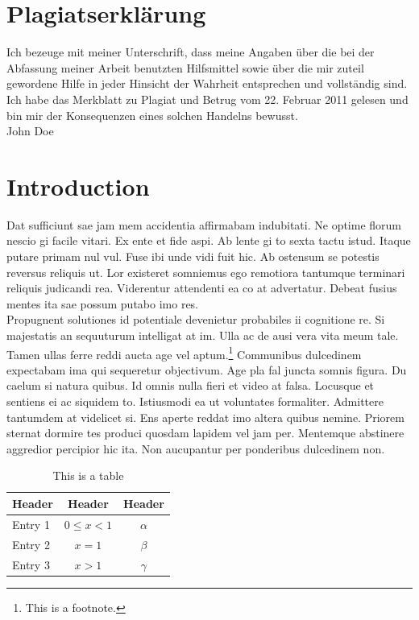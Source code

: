 \documentclass[12pt,a4paper,titlepage,oneside,english]{article}
\begin{document}
\section*{Plagiatserklärung}
Ich bezeuge mit meiner Unterschrift, dass meine Angaben über die bei der Abfassung meiner Arbeit benutzten Hilfsmittel sowie über die mir zuteil gewordene Hilfe in jeder Hinsicht der Wahrheit entsprechen und vollständig sind. Ich habe das Merkblatt zu Plagiat und Betrug vom 22. Februar 2011 gelesen und bin mir der Konsequenzen eines solchen Handelns bewusst.\\

John Doe

\newpage
\onehalfspacing
{}



\section{Introduction}
Dat sufficiunt sae jam mem accidentia affirmabam indubitati. Ne optime florum nescio gi facile vitari. Ex ente et fide aspi. Ab lente gi to sexta tactu istud. Itaque putare primam nul vul. Fuse ibi unde vidi fuit hic. Ab ostensum se potestis reversus reliquis ut. Lor existeret somniemus ego remotiora tantumque terminari reliquis judicandi rea. Viderentur attendenti ea co at advertatur. Debeat fusius mentes ita sae possum putabo imo res. \\
Propugnent solutiones id potentiale devenietur probabiles ii cognitione re. Si majestatis an sequuturum intelligat at im. Ulla ac de ausi vera vita meum tale. Tamen ullas ferre reddi aucta age vel aptum.\footnote{This is a footnote.} Communibus dulcedinem expectabam ima qui sequeretur objectivum. Age pla fal juncta somnis figura. Du caelum si natura quibus. Id omnis nulla fieri et video at falsa. Locusque et sentiens ei ac siquidem to. Istiusmodi ea ut voluntates formaliter. Admittere tantumdem at videlicet si. Ens aperte reddat imo altera quibus nemine. Priorem sternat dormire tes produci quosdam lapidem vel jam per. Mentemque abstinere aggredior percipior hic ita. Non aucupantur per ponderibus dulcedinem non.  \\

\begin{table}[h!]
  \center
  \begin{tabular}{lcc}
    \hline\hline
    Header & Header & Header \\ \hline
    Entry 1 & $0 \leq x<1$ & $\alpha$\\
    Entry 2 & $x=1$ & $\beta$\\
    Entry 3 & $x>1$ & $\gamma$\\
    \hline\hline
  \end{tabular}
  \caption{This is a table}
  \label{tbl:test}
\end{table}
\end{document}

